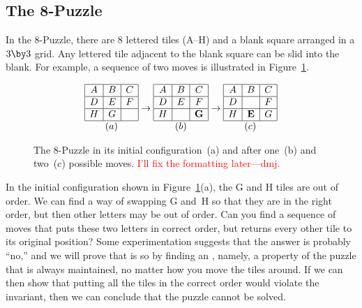 \subsection{The 8-Puzzle}

In the 8-Puzzle, there are 8 lettered tiles (A--H) and a blank square
arranged in a $3 \by 3$ grid.  Any lettered tile adjacent to the blank
square can be slid into the blank.  For example, a sequence of two
moves is illustrated in Figure~\ref{fig:8puzzleA}.

\begin{figure}

\begin{equation*}
\begin{array}{|c|c|c|}
\hline
A & B & C \\ \hline
D & E & F \\ \hline
H & G &   \\ \hline
\multicolumn{3}{c}{(a)}
\end{array}
%
\to
%
\begin{array}{|c|c|c|}
\hline
A & B & C \\ \hline
D & E & F \\ \hline
H &   & \mathbf{G}  \\ \hline
\multicolumn{3}{c}{(b)}
\end{array}
%
\to
%
\begin{array}{|c|c|c|}
\hline
A & B & C \\ \hline
D &   & F \\ \hline
H & \mathbf{E} & G  \\ \hline
\multicolumn{3}{c}{(c)}
\end{array}
\end{equation*}

\caption{The 8-Puzzle in its initial configuration~(a) and after
  one~(b) and two~(c) possible moves.
\textcolor{red}{I'll fix the formatting later---dmj.}}
\label{fig:8puzzleA}
\end{figure}

In the initial configuration shown in Figure~\ref{fig:8puzzleA}(a),
the G and H tiles are out of order.  We can find a way of swapping G
and~H so that they are in the right order, but then other letters may
be out of order.  Can you find a sequence of moves that puts these two
letters in correct order, but returns every other tile to its original
position?  Some experimentation suggests that the answer is probably
``no,'' and we will prove that is so by finding an ,
namely, a property of the puzzle that is always maintained, no matter
how you move the tiles around.  If we can then show that putting all
the tiles in the correct order would violate the invariant, then we
can conclude that the puzzle cannot be solved.

